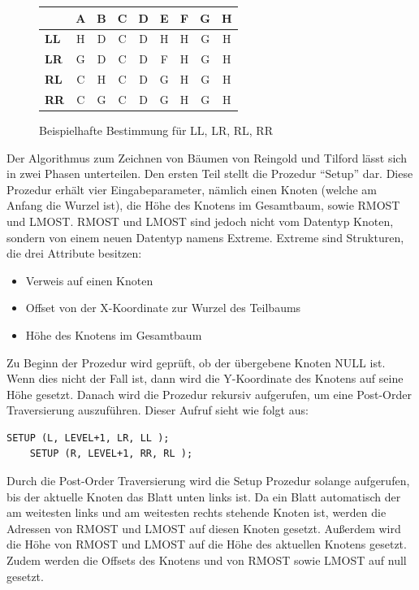 \begin{figure}[ht]
\begin{minipage}[]{0.3\linewidth}
    \end{minipage}
    \hfill
    \begin{minipage}[]{0.65\linewidth}
        \centering
        \begin{tabular}{l | c | c | c | c | c | c | c | c}
            & A & B & C & D & E & F & G & H \\
            \hline\hline
            \textbf{LL} & H & D & C & D & H & H & G & H \\
            \textbf{LR} & G & D & C & D & F & H & G & H \\
            \textbf{RL} & C & H & C & D & G & H & G & H \\
            \textbf{RR} & C & G & C & D & G & H & G & H \\
            \end{tabular}
    \end{minipage} 
    \caption{Beispielhafte Bestimmung für LL, LR, RL, RR}
\end{figure}

Der Algorithmus zum Zeichnen von Bäumen von Reingold und Tilford lässt sich in zwei Phasen unterteilen.
Den ersten Teil stellt die Prozedur “Setup” dar. Diese Prozedur erhält vier Eingabeparameter, nämlich einen Knoten (welche am Anfang 
die Wurzel ist), die Höhe des Knotens im Gesamtbaum, sowie RMOST und LMOST. RMOST und LMOST sind jedoch nicht vom Datentyp Knoten, sondern 
von einem neuen Datentyp namens Extreme. Extreme sind Strukturen, die drei Attribute besitzen: 
\begin{itemize}
    \item Verweis auf einen Knoten
    \item Offset von der X-Koordinate zur Wurzel des Teilbaums
    \item Höhe des Knotens im Gesamtbaum
\end{itemize}

Zu Beginn der Prozedur wird geprüft, ob der übergebene Knoten NULL ist. Wenn dies nicht der Fall ist, 
dann wird die Y-Koordinate des Knotens auf seine Höhe gesetzt. Danach wird die Prozedur rekursiv aufgerufen, 
um eine Post-Order Traversierung auszuführen. Dieser Aufruf sieht wie folgt aus:

\begin{lstlisting}[caption = Rekursiver Aufruf von Setup]
    SETUP (L, LEVEL+1, LR, LL );
    SETUP (R, LEVEL+1, RR, RL );
\end{lstlisting}

Durch die Post-Order Traversierung wird die Setup Prozedur solange aufgerufen, bis der aktuelle Knoten das Blatt unten links ist. 
Da ein Blatt automatisch der am weitesten links und am weitesten rechts stehende Knoten ist, werden die Adressen von 
RMOST und LMOST auf diesen Knoten gesetzt. Außerdem wird die Höhe von RMOST und LMOST auf die Höhe des aktuellen Knotens gesetzt. 
Zudem werden die Offsets des Knotens und von RMOST sowie LMOST auf null gesetzt. 

